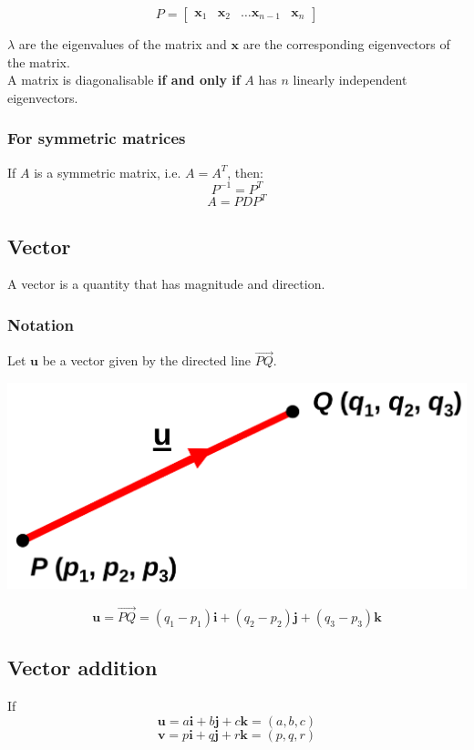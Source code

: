 \documentclass[11pt]{article}
\begin{document}
\begin{displaymath}
P = \begin{bmatrix}
\boldsymbol{x}_1 & \boldsymbol{x}_2 & \ldots \boldsymbol{x}_{n-1} & \boldsymbol{x}_{n}
\end{bmatrix}
\end{displaymath}

\(\lambda\) are the eigenvalues of the matrix and \(\boldsymbol{x}\) are the corresponding eigenvectors of the matrix.
\\[0pt]

A matrix is diagonalisable \textbf{if and only if} \(A\) has \(n\) linearly independent eigenvectors.

\subsubsection{For symmetric matrices}
\label{sec:org2ebed4d}
If \(A\) is a symmetric matrix, i.e. \(A = A^T\), then:
\[P^{-1} = P^T\]
\[A = PDP^T\]

\subsection{Vector}
\label{sec:orgacf6c3a}
A vector is a quantity that has magnitude and direction.

\subsubsection{Notation}
\label{sec:orge1ccc18}
Let \(\boldsymbol{u}\) be a vector given by the directed line \(\overrightarrow{PQ}\).
\begin{center}
\includegraphics[width=.9\linewidth]{./images/vector-notation-line-pq.png}
\end{center}

\[\boldsymbol{u} = \overrightarrow{PQ} = (q_1 - p_1) \boldsymbol{i} + (q_2 - p_2) \boldsymbol{j} + (q_3 - p_3) \boldsymbol{k}\]

\subsection{Vector addition}
\label{sec:orgd62292b}
If
\[\boldsymbol{u} = a \boldsymbol{i} + b \boldsymbol{j} + c \boldsymbol{k} = (a, b, c)\]
\[\boldsymbol{v} = p \boldsymbol{i} + q \boldsymbol{j} + r \boldsymbol{k} = (p, q, r)\]
\end{document}
